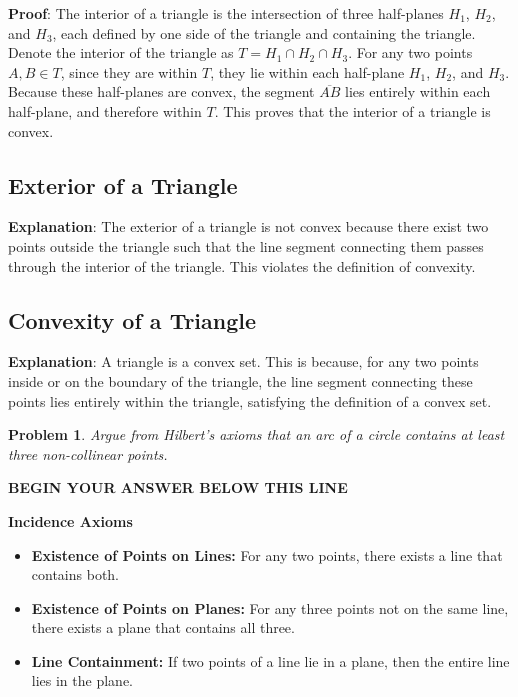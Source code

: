 \documentclass[letter,12pt]{article}
\newtheorem{problem}[main_theorem]{Problem}
\newcommand{\answerspacetop}{
	\begin{center}
		\textbf{BEGIN YOUR ANSWER BELOW THIS LINE} \\ \hrulefill
	\end{center}
}
\begin{document}
\textbf{Proof}: The interior of a triangle is the intersection of three half-planes $H_1$, $H_2$, and $H_3$, each defined by one side of the triangle and containing the triangle. Denote the interior of the triangle as $T = H_1 \cap H_2 \cap H_3$. For any two points $A, B \in T$, since they are within $T$, they lie within each half-plane $H_1$, $H_2$, and $H_3$. Because these half-planes are convex, the segment $\overline{AB}$ lies entirely within each half-plane, and therefore within $T$. This proves that the interior of a triangle is convex.

\subsection*{Exterior of a Triangle}

\textbf{Explanation}: The exterior of a triangle is not convex because there exist two points outside the triangle such that the line segment connecting them passes through the interior of the triangle. This violates the definition of convexity.

\subsection*{Convexity of a Triangle}

\textbf{Explanation}: A triangle is a convex set. This is because, for any two points inside or on the boundary of the triangle, the line segment connecting these points lies entirely within the triangle, satisfying the definition of a convex set.

\pagebreak

\begin{problem}
  Argue from Hilbert's axioms that an arc of a circle contains at least three non-collinear points.
\end{problem}

\answerspacetop
\textbf{Incidence Axioms}
\begin{itemize}
	\item \textbf{Existence of Points on Lines:} For any two points, there exists a line that contains both.
	\item \textbf{Existence of Points on Planes:} For any three points not on the same line, there exists a plane that contains all three.
	\item \textbf{Line Containment:} If two points of a line lie in a plane, then the entire line lies in the plane.
\end{itemize}
\end{document}
